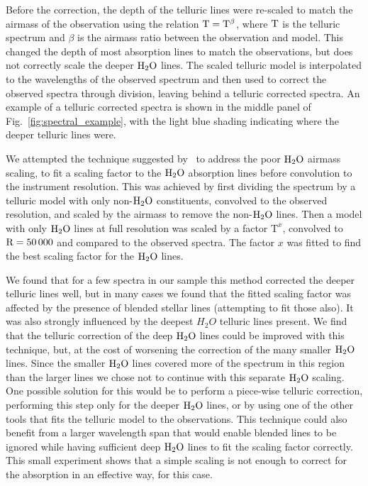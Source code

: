 \documentclass[fleqn,usenatbib]{mnras}
\begin{document}
Before the correction, the depth of the telluric lines were re-scaled to match the airmass of the observation using the relation \(\rm T = T^{\beta} \), where \(\rm T\) is the telluric spectrum and \(\beta \) is the airmass ratio between the observation and model. This changed the depth of most absorption lines to match the observations, but does not correctly scale the deeper \(\rm H_{2}O \) lines. The scaled telluric model is interpolated to the wavelengths of the observed spectrum and then used to correct the observed spectra through division, leaving behind a telluric corrected spectra. An example of a telluric corrected spectra is shown in the middle panel of Fig.~\ref{fig:spectral_example}, with the light blue shading indicating where the deeper telluric lines were.

We attempted the technique suggested by~\citet{bertaux_tapas_2014} to address the poor \(\rm H_{2}O \) airmass scaling, to fit a scaling factor to the \(\rm {H}_{2}O \) absorption lines before convolution to the instrument resolution. This was achieved by first dividing the spectrum by a telluric model with only non-\(\rm H_{2}O \) constituents, convolved to the observed resolution, and scaled by the airmass to remove the non-\(\rm H_{2}O \) lines. Then a model with only \(\rm H_{2}O \) lines at full resolution was scaled by a factor \(\textrm{T}^{x} \), convolved to \(\rm R=50\,000 \) and compared to the observed spectra. The factor \(x \) was fitted to find the best scaling factor for the \(\rm H_{2}O \) lines.

We found that for a few spectra in our sample this method corrected the deeper telluric lines well, but in many cases we found that the fitted scaling factor was affected by the presence of blended stellar lines (attempting to fit those also). It was also strongly influenced by the deepest \(H_{2}O\) telluric lines present. We find that the telluric correction of the deep \(\rm H_{2}O \) lines could be improved with this technique, but, at the cost of worsening the correction of the many smaller \(\rm H_{2}O \) lines. Since the smaller \(\rm H_{2}O \) lines covered more of the spectrum in this region than the larger lines we chose not to continue with this separate \(\rm H_{2}O \) scaling. One possible solution for this would be to perform a piece-wise telluric correction, performing this step only for the deeper \( \rm H_{2}O\) lines, or by using one of the other tools that fits the telluric model to the observations. This technique could also benefit from a larger wavelength span that would enable blended lines to be ignored while having sufficient deep \(\rm H_{2}O\) lines to fit the scaling factor correctly. This small experiment shows that a simple scaling is not enough to correct for the absorption in an effective way, for this case.
\end{document}
